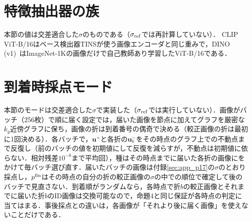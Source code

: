 \begin{table}[htbp]
\centering
\caption{OpenOOD v1.5 ImageNet-200（[\%]，単体，\NInTwoZeroZeroNDraws{}通りの抽出の平均）．$\dagger$はOpenOOD v1.5~\cite{zhang2023openood}の報告値（ImageNet-200で学習したResNet-18；リーダーボードと同論文の脚注6が指す公開の表）．全学習画像のkNN・クラス平均は本稿と同じ2つの特徴，ゼロショットはCLIP ViT-B/16（）．上限付きの種は$\tau{=}0.05$の$\sigma$（付録\ref{sec:app_cap}）．\textcolor{sotacol}{$\bigstar$}は列の最良値，\colorbox{upd}{青}は本手法以外の全行（報告値，全学習画像・ゼロショットの基線，静的検出器，LGC-max）を上回る値．}
\label{tab:in200}
\vspace{1.5mm}

\end{table}

\section{特徴抽出器の族}
\label{sec:app_views}
本節の値は交差適合した$\sigma$のものである（$\sigma_{\mathrm{ref}}$では再計算していない）．
CLIP ViT-B/16はベース検出器TINSが使う画像エンコーダと同じ重みで，DINO (v1)~\cite{caron2021dino}はImageNet-1Kの画像だけで自己教師あり学習したViT-B/16である．

\begin{table}[htbp]
\centering
\caption{6つの特徴抽出器をそれぞれ単一のビューとした値（\FPR{}[\%]，OpenOOD v1.5 ImageNet-1K，近＝near-OOD，遠＝far-OOD，抽出1通り）．}
\label{tab:views}
\vspace{1.5mm}

\end{table}

\section{到着時採点モード}
\label{sec:app_online}
本節のモードは交差適合した$\sigma$で実装した（$\sigma_{\mathrm{ref}}$では実行していない）．画像がバッチ（256枚）で順に届く設定では，届いた画像を節点に加えてグラフを厳密な$k_g$近傍グラフに保ち，画像の折は到着番号の偶奇で決める（較正画像の折は最初に1回決める）．各バッチで，$\mathbf{u}^{+}$と各折の$\mathbf{u}^{-}_b$をその時点のグラフ上での不動点まで反復し（前のバッチの値を初期値にして反復を減らすが，不動点は初期値に依らない．相対残差$10^{-8}$まで平均\NOnlItersMean{}回），種はその時点までに届いた各折の画像にをかけて毎バッチ選び直す．届いたバッチの画像は付録\ref{sec:app_p17}の$\sigma$のとおり採点し，$p^{\mathrm{fin}}$はその時点の自分の折の較正画像の$\sigma$の中での順位で確定して後のバッチで見直さない．到着順がランダムなら，各時点で折$b$の較正画像とそれまでに届いた折$b$のID画像は交換可能なので，命題4と同じ保証が各時点の判定に当てはまる．事後採点との違いは，各画像が「それより後に届く画像」を使えないことだけである．

